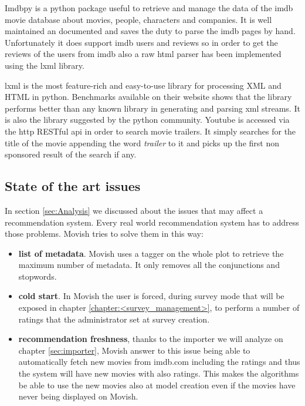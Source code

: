 Imdbpy is a python package useful to retrieve and manage the data of the imdb movie database about movies, people, characters and companies. It is well maintained an documented and saves the duty to parse the imdb pages by hand. Unfortunately it does support imdb users and reviews so in order to get the reviews of the users from imdb also a raw html parser has been implemented using the lxml library.

lxml is the most feature-rich and easy-to-use library for processing XML and HTML in python. Benchmarks available on their website shows that the library performs better than any known library in generating and parsing xml streams. It is also the library suggested by the python community.
Youtube is accessed via the http RESTful api in order to search movie trailers. It simply searches for the title of the movie appending the word \textit{trailer} to it and picks up the first non sponsored result of the search if any.

\subsection{State of the art issues}
\label{sec:state_of_the_art_issues}

In section \ref{sec:Analysis} we discussed about the issues that may affect a recommendation system. Every real world recommendation system has to address those problems. Movish tries to solve them in this way:

\begin{itemize}
\item \textbf{list of metadata}. Movish uses a tagger on the whole plot to retrieve the maximum number of metadata. It only removes all the conjunctions and stopwords.
\item \textbf{cold start}. In Movish the user is forced, during survey mode that will be exposed in chapter \ref{chapter:<survey_management>}, to perform a number of ratings that the administrator set at survey creation.
\item \textbf{recommendation freshness}, thanks to the importer we will analyze on chapter \ref{sec:importer}, Movish answer to this issue being able to automatically fetch new movies from imdb.com including the ratings and thus the system will have new movies with also ratings. This makes the algorithms be able to use the new movies also at model creation even if the movies have never being displayed on Movish.
\end{itemize}

